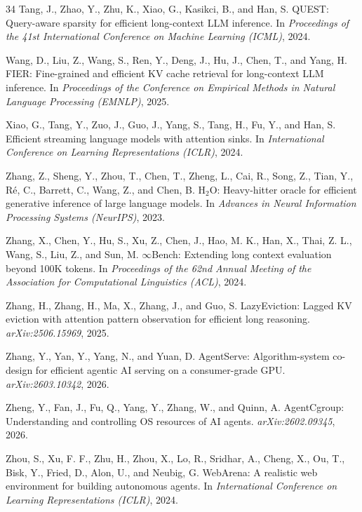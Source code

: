 \documentclass{article}
\begin{document}
\begin{thebibliography}{34}
Tang, J., Zhao, Y., Zhu, K., Xiao, G., Kasikci, B., and Han, S.
\newblock QUEST: Query-aware sparsity for efficient long-context LLM
  inference.
\newblock In \emph{Proceedings of the 41st International Conference on
  Machine Learning (ICML)}, 2024.

Wang, D., Liu, Z., Wang, S., Ren, Y., Deng, J., Hu, J., Chen, T., and
  Yang, H.
\newblock FIER: Fine-grained and efficient KV cache retrieval for
  long-context LLM inference.
\newblock In \emph{Proceedings of the Conference on Empirical Methods in
  Natural Language Processing (EMNLP)}, 2025.

Xiao, G., Tang, Y., Zuo, J., Guo, J., Yang, S., Tang, H., Fu, Y.,
  and Han, S.
\newblock Efficient streaming language models with attention sinks.
\newblock In \emph{International Conference on Learning Representations
  (ICLR)}, 2024.

Zhang, Z., Sheng, Y., Zhou, T., Chen, T., Zheng, L., Cai, R., Song, Z.,
  Tian, Y., R{\'e}, C., Barrett, C., Wang, Z., and Chen, B.
\newblock H$_2$O: Heavy-hitter oracle for efficient generative inference
  of large language models.
\newblock In \emph{Advances in Neural Information Processing Systems
  (NeurIPS)}, 2023.

Zhang, X., Chen, Y., Hu, S., Xu, Z., Chen, J., Hao, M. K., Han, X.,
  Thai, Z. L., Wang, S., Liu, Z., and Sun, M.
\newblock $\infty$Bench: Extending long context evaluation beyond 100K
  tokens.
\newblock In \emph{Proceedings of the 62nd Annual Meeting of the
  Association for Computational Linguistics (ACL)}, 2024.

Zhang, H., Zhang, H., Ma, X., Zhang, J., and Guo, S.
\newblock LazyEviction: Lagged KV eviction with attention pattern
  observation for efficient long reasoning.
\newblock \emph{arXiv:2506.15969}, 2025.

Zhang, Y., Yan, Y., Yang, N., and Yuan, D.
\newblock AgentServe: Algorithm-system co-design for efficient agentic
  AI serving on a consumer-grade GPU.
\newblock \emph{arXiv:2603.10342}, 2026.

Zheng, Y., Fan, J., Fu, Q., Yang, Y., Zhang, W., and Quinn, A.
\newblock AgentCgroup: Understanding and controlling OS resources of AI
  agents.
\newblock \emph{arXiv:2602.09345}, 2026.

Zhou, S., Xu, F. F., Zhu, H., Zhou, X., Lo, R., Sridhar, A.,
  Cheng, X., Ou, T., Bisk, Y., Fried, D., Alon, U., and Neubig, G.
\newblock WebArena: A realistic web environment for building autonomous
  agents.
\newblock In \emph{International Conference on Learning
  Representations (ICLR)}, 2024.

\end{thebibliography}
\end{document}
